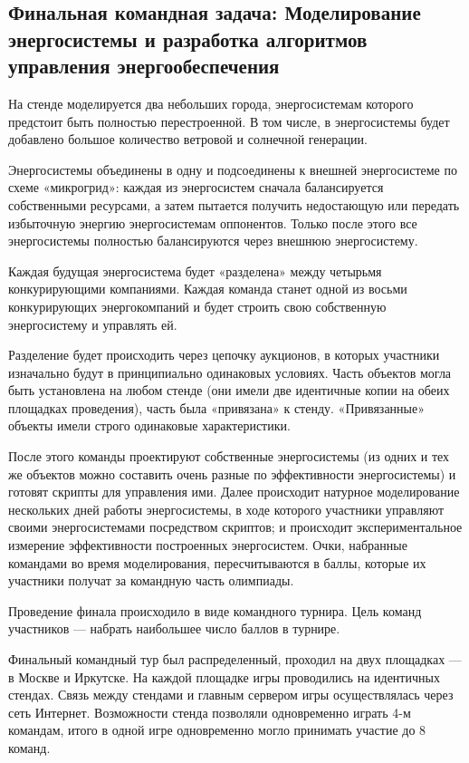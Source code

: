 \subsection*{Финальная командная задача: Моделирование энергосистемы и разработка алгоритмов управления энергообеспечения}

На стенде моделируется два небольших города, энергосистемам которого предстоит быть полностью перестроенной. В том числе, в энергосистемы будет добавлено большое количество ветровой и солнечной генерации.

Энергосистемы объединены в одну и подсоединены к внешней энергосистеме по схеме «микрогрид»: каждая из энергосистем сначала балансируется собственными ресурсами, а затем пытается получить недостающую или передать избыточную энергию энергосистемам оппонентов. Только после этого все энергосистемы полностью балансируются через внешнюю энергосистему.

Каждая будущая энергосистема будет «разделена» между четырьмя конкурирующими компаниями. Каждая команда станет одной из восьми конкурирующих энергокомпаний и будет строить свою собственную энергосистему и управлять ей.

Разделение будет происходить через цепочку аукционов, в которых участники изначально будут в принципиально одинаковых условиях. Часть объектов могла быть установлена на любом стенде (они имели две идентичные копии на обеих площадках проведения), часть была «привязана» к стенду. «Привязанные» объекты имели строго одинаковые характеристики.

После этого команды проектируют собственные энергосистемы (из одних и тех же объектов можно составить очень разные по эффективности энергосистемы) и готовят скрипты для управления ими. Далее происходит натурное моделирование нескольких дней работы энергосистемы, в ходе которого участники управляют своими энергосистемами посредством скриптов; и происходит экспериментальное измерение эффективности построенных энергосистем. Очки, набранные командами во время моделирования, пересчитываются в баллы, которые их участники получат за командную часть олимпиады.

Проведение финала происходило в виде командного турнира. Цель команд участников — набрать наибольшее число баллов в турнире.

Финальный командный тур был распределенный, проходил на двух площадках — в Москве и Иркутске. На каждой площадке игры проводились на идентичных стендах. Связь между стендами и главным сервером игры осуществлялась через сеть Интернет. Возможности стенда позволяли одновременно играть 4-м командам, итого в одной игре одновременно могло принимать участие до 8 команд.

